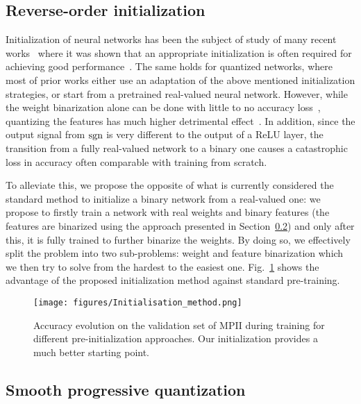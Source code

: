 \documentclass[10pt,twocolumn,letterpaper]{article}
\begin{document}
\subsection{Reverse-order initialization}\label{ssec:progressive-initialisation}

Initialization of neural networks has been the subject of study of many recent works~\cite{glorot2010understanding,he2015delving,saxe2013exact} where it was shown that an appropriate initialization is often required for achieving good performance~\cite{sutskever2013importance}. The same holds for quantized networks, where most of prior works either use an adaptation of the above mentioned initialization strategies, or start from a pretrained real-valued neural network. However, while the weight binarization alone can be done with little to no accuracy loss~\cite{rastegari2016xnor}, quantizing the features has much higher detrimental effect~\cite{rastegari2016xnor,zhou2016dorefa}. In addition, since the output signal from $\operatorname{sgn}$ is very different to the output of a ReLU layer, the transition from a fully real-valued network to a binary one causes a catastrophic loss in accuracy often comparable with training from scratch.

To alleviate this, we propose the opposite of what is currently considered the standard method to initialize a binary network from a real-valued one: we propose to firstly train a network with real weights and binary features (the features are binarized using the approach presented in Section~\ref{ssec:progressive-quantization}) and only after this, it is fully trained to further binarize the weights. By doing so, we effectively split the problem into two sub-problems: weight and feature binarization which we then try to solve from the hardest to the easiest one. Fig.~\ref{fig:init-method} shows the advantage of the proposed initialization method against standard pre-training. 

\begin{figure}[!htbp]
    \centering
    \texttt{[image: figures/Initialisation\_method.png]}
    \caption{Accuracy evolution on the validation set of MPII during training for different pre-initialization approaches. Our initialization provides a much better starting point.}
    \label{fig:init-method}
\end{figure}

\subsection{Smooth progressive quantization}\label{ssec:progressive-quantization}
\end{document}
